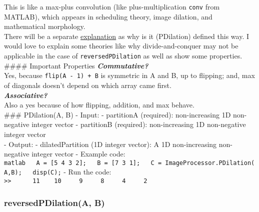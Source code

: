 \documentclass[11pt]{amsart}
\theoremstyle{remark}
\theoremstyle{definition}
\theoremstyle{remark}
\numberwithin{equation}{section}
\begin{document}
This is like a max-plus convolution (like plus-multiplication
\texttt{conv} from MATLAB), which appears in scheduling theory, image
dilation, and mathematical morphology.\\
There will be a separate
\href{https://github.com/zedttxj/Image-Processing-Tool-with-Matlab/blob/main/optional/PDilation-reversedPDilation.md}{explanation}
as why is it (PDilation) defined this way. I would love to explain some
theories like why divide-and-conquer may not be applicable in the case
of \texttt{reversedPDilation} as well as show some properties.\\
\#\#\#\# Important Properties \textbf{\emph{Commutative?}}\\
Yes, because \texttt{flip(A\ -\ 1)\ +\ B\textquotesingle{}} is symmetric
in A and B, up to flipping; and, max of diagonals doesn't depend on
which array came first.\\
\textbf{\emph{Associative?}}\\
Also a yes because of how flipping, addition, and max behave.\\
\#\#\# PDilation(A, B) - Input: - partitionA (required): non-increasing
1D non-negative integer vector - partitionB (required): non-increasing
1D non-negative integer vector\\
- Output: - dilatedPartition (1D integer vector): A 1D non-increasing
non-negative integer vector - Example code:
\texttt{matlab\ \ \ A\ =\ {[}5\ 4\ 3\ 2{]};\ \ \ B\ =\ {[}7\ 3\ 1{]};\ \ \ C\ =\ ImageProcessor.PDilation(A,B);\ \ \ disp(C);}
- Run the code:
\texttt{\textgreater{}\textgreater{}\ \ \ \ \ \ 11\ \ \ \ 10\ \ \ \ \ 9\ \ \ \ \ 8\ \ \ \ \ 4\ \ \ \ \ 2}

\subsubsection{reversedPDilation(A, B)}\label{reversedpdilationa-b}
\end{document}
